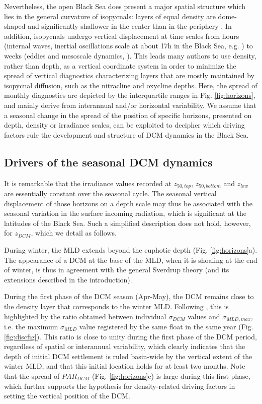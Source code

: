 \documentclass[journal abbreviation, manuscript]{copernicus}
\begin{document}
Nevertheless, the open Black Sea does present a major spatial structure which lies in the general curvature of isopycnals: layers of equal density are dome-shaped and significantly shallower in the center than in the periphery \citep{murray1991}.
In addition, isopycnals undergo vertical displacement at time scales from hours (internal waves, inertial oscillations scale at about 17\unit{h} in the Black Sea, e.g. \citet{Filonov2000}) to weeks (eddies and mesoscale dynamics, \citet{Stanev2013}).
This leads many authors to use density, rather than depth, as a vertical coordinate system \citep{Tugrul1992} in order to minimize the spread of vertical diagnostics characterizing layers that are mostly maintained by isopycnal diffusion, such as the nitracline and oxycline depths.
Here, the spread of monthly diagnostics are depicted by the interquartile ranges in Fig. \ref{fig:horizons}, and mainly derive from interannual and/or horizontal variability.
We assume that a seasonal change in the spread of the position of specific horizons, presented on depth, density or irradiance scales, can be exploited to decipher which driving factors rule the development and structure of DCM dynamics in the Black Sea.

\subsection{Drivers of the seasonal DCM dynamics}
It is remarkable that the irradiance values recorded at $z_{50,top}$, $z_{50,bottom}$ and $z_{low}$ are essentially constant over the seasonal cycle.
The seasonal vertical displacement of those horizons on a depth scale may thus be associated with the seasonal variation in the surface incoming radiation, which is significant at the latitudes of the Black Sea.
Such a simplified description does not hold, however, for $z_{DCM}$, which we detail as follows.

During winter, the MLD extends beyond the euphotic depth (Fig. \ref{fig:horizons}a). 
The appearance of a DCM at the base of the MLD, when it is shoaling at the end of winter, is thus in agreement with the general Sverdrup theory (and its extensions described in the introduction).

During the first phase of the DCM season (Apr-May), the DCM remains close to the density layer that corresponds to the winter MLD. Following \cite{Navarro2013}, this is highlighted by the ratio obtained between individual $\sigma_{DCM}$ values and $\sigma_{MLD,max}$, i.e. the maximum $\sigma_{MLD}$ value registered by the same float in the same year (Fig. \ref{fig:discfig}).
This ratio is close to unity during the first phase of the DCM period, regardless of spatial or interannual variability, which clearly indicates that the depth of initial DCM settlement is ruled basin-wide by the vertical extent of the winter MLD, and that this initial location holds for at least two months. 
Note that the spread of $PAR_{DCM}$ (Fig. \ref{fig:horizons}c) is large during this first phase, which further supports the hypothesis for density-related driving factors in setting the vertical position of the DCM. 
\end{document}
